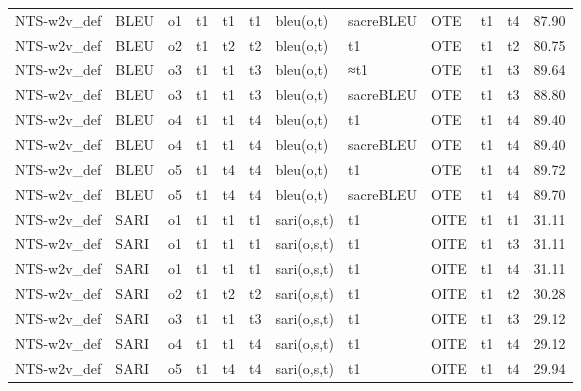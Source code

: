 \begin{tabular}{lllllllllllr}
 NTS-w2v\_def &      BLEU &     o1 &      t1 &         t1 &       t1 &    bleu(o,t) &  sacreBLEU &       OTE &       t1 &           t4 &                   87.90 \\
 NTS-w2v\_def &      BLEU &     o2 &      t1 &         t2 &       t2 &   bleu(o,t)  &         t1 &      OTE  &       t1 &           t2 &                   80.75 \\
 NTS-w2v\_def &      BLEU &     o3 &      t1 &         t1 &       t3 &   bleu(o,t)  &        ≈t1 &      OTE  &       t1 &           t3 &                   89.64 \\
 NTS-w2v\_def &      BLEU &     o3 &      t1 &         t1 &       t3 &   bleu(o,t)  &  sacreBLEU &      OTE  &       t1 &           t3 &                   88.80 \\
 NTS-w2v\_def &      BLEU &     o4 &      t1 &         t1 &       t4 &    bleu(o,t) &         t1 &       OTE &       t1 &           t4 &                   89.40 \\
 NTS-w2v\_def &      BLEU &     o4 &      t1 &         t1 &       t4 &    bleu(o,t) &  sacreBLEU &       OTE &       t1 &           t4 &                   89.40 \\
 NTS-w2v\_def &      BLEU &     o5 &      t1 &         t4 &       t4 &    bleu(o,t) &         t1 &       OTE &       t1 &           t4 &                   89.72 \\
 NTS-w2v\_def &      BLEU &     o5 &      t1 &         t4 &       t4 &    bleu(o,t) &  sacreBLEU &       OTE &       t1 &           t4 &                   89.70 \\
 NTS-w2v\_def &      SARI &     o1 &      t1 &         t1 &       t1 &  sari(o,s,t) &         t1 &      OITE &       t1 &           t1 &                   31.11 \\
 NTS-w2v\_def &      SARI &     o1 &      t1 &         t1 &       t1 &  sari(o,s,t) &         t1 &      OITE &       t1 &           t3 &                   31.11 \\
 NTS-w2v\_def &      SARI &     o1 &      t1 &         t1 &       t1 &  sari(o,s,t) &         t1 &      OITE &       t1 &           t4 &                   31.11 \\
 NTS-w2v\_def &      SARI &     o2 &      t1 &         t2 &       t2 &  sari(o,s,t) &         t1 &      OITE &       t1 &           t2 &                   30.28 \\
 NTS-w2v\_def &      SARI &     o3 &      t1 &         t1 &       t3 &  sari(o,s,t) &         t1 &      OITE &       t1 &           t3 &                   29.12 \\
 NTS-w2v\_def &      SARI &     o4 &      t1 &         t1 &       t4 &  sari(o,s,t) &         t1 &      OITE &       t1 &           t4 &                   29.12 \\
 NTS-w2v\_def &      SARI &     o5 &      t1 &         t4 &       t4 &  sari(o,s,t) &         t1 &      OITE &       t1 &           t4 &                   29.94 \\
\bottomrule
\end{tabular}
